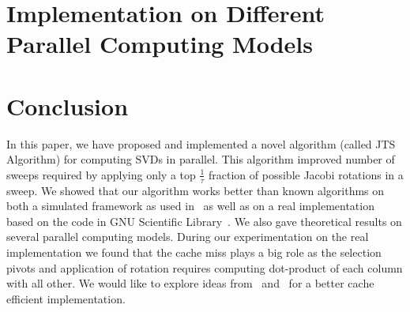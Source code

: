 \documentclass[10pt, conference, compsocconf]{IEEEtran}
\begin{document}
\section{Implementation on Different Parallel Computing Models}
\label{sec:other}

\lipsum[1-2]

\section{Conclusion}
\label{sec:conclude}

In this paper, we have proposed and implemented a novel algorithm (called JTS Algorithm) for computing SVDs in parallel. This algorithm improved number of sweeps required by applying only a top $\frac{1}{\tau}$ fraction of possible Jacobi rotations in a sweep. We showed that our algorithm works better than known algorithms on both a simulated framework as used in~\cite{rajasekaran2008relaxation} as well as on a real implementation based on the code in GNU Scientific Library~\cite{galassi1996gnu}. We also gave theoretical results on several parallel computing models. During our experimentation on the real implementation we found that the cache miss plays a big role as the selection pivots and application of rotation requires computing dot-product of each column with all other. We would like to explore ideas from~\cite{soliman2008memory} and~\cite{haidar2013improved} for a better cache efficient implementation.

%
%
%
\end{document}
